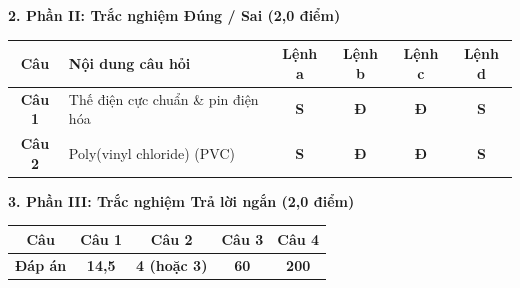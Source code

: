 \documentclass[11pt,a4paper]{article}
\begin{document}
\vspace{2pt}
\noindent
\textbf{\color{mainGreen}2. Phần II: Trắc nghiệm Đúng / Sai (2,0 điểm)}
\begin{center}
\renewcommand{\arraystretch}{1.2}
\begin{tabular}{|c|p{7.5cm}|c|c|c|c|}
\hline
\rowcolor{tableGreen}
\textbf{Câu} & \textbf{Nội dung câu hỏi} & \textbf{Lệnh a} & \textbf{Lệnh b} & \textbf{Lệnh c} & \textbf{Lệnh d} \\
\hline
\textbf{Câu 1} & Thế điện cực chuẩn \& pin điện hóa & \textbf{\color{gray}S} & \textbf{\color{hfRed}Đ} & \textbf{\color{hfRed}Đ} & \textbf{\color{gray}S} \\
\hline
\textbf{Câu 2} & Poly(vinyl chloride) (PVC) & \textbf{\color{gray}S} & \textbf{\color{hfRed}Đ} & \textbf{\color{hfRed}Đ} & \textbf{\color{gray}S} \\
\hline
\end{tabular}
\end{center}

\vspace{2pt}
\noindent
\textbf{\color{mainGreen}3. Phần III: Trắc nghiệm Trả lời ngắn (2,0 điểm)}
\begin{center}
\renewcommand{\arraystretch}{1.2}
\begin{tabular}{|c|c|c|c|c|}
\hline
\rowcolor{tableGreen}
\textbf{Câu} & \textbf{Câu 1} & \textbf{Câu 2} & \textbf{Câu 3} & \textbf{Câu 4} \\
\hline
\textbf{Đáp án} & \textbf{\color{hfRed}14,5} & \textbf{\color{hfRed}4 (hoặc 3)} & \textbf{\color{hfRed}60} & \textbf{\color{hfRed}200} \\
\hline
\end{tabular}
\end{center}
\end{document}
